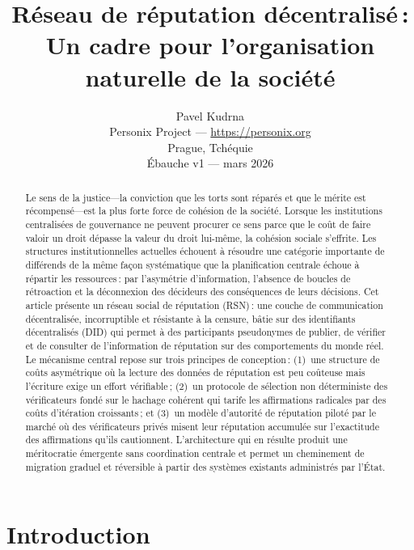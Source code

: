 \documentclass[11pt,a4paper,twocolumn]{article}
\title{\textbf{Réseau de réputation décentralisé\,:\\Un cadre pour l'organisation naturelle de la société}}
\author{Pavel Kudrna\\Personix Project --- \url{https://personix.org}\\Prague, Tchéquie\\Ébauche v1 --- mars 2026}
\date{}
\begin{document}
\maketitle

\begin{abstract}
Le sens de la justice---la conviction que les torts sont réparés et que le mérite est récompensé---est la plus forte force de cohésion de la société. Lorsque les institutions centralisées de gouvernance ne peuvent procurer ce sens parce que le coût de faire valoir un droit dépasse la valeur du droit lui-même, la cohésion sociale s'effrite. Les structures institutionnelles actuelles échouent à résoudre une catégorie importante de différends de la même façon systématique que la planification centrale échoue à répartir les ressources\,: par l'asymétrie d'information, l'absence de boucles de rétroaction et la déconnexion des décideurs des conséquences de leurs décisions. Cet article présente un réseau social de réputation (RSN)\,: une couche de communication décentralisée, incorruptible et résistante à la censure, bâtie sur des identifiants décentralisés (DID) qui permet à des participants pseudonymes de publier, de vérifier et de consulter de l'information de réputation sur des comportements du monde réel. Le mécanisme central repose sur trois principes de conception\,: (1)~une structure de coûts asymétrique où la lecture des données de réputation est peu coûteuse mais l'écriture exige un effort vérifiable\,; (2)~un protocole de sélection non déterministe des vérificateurs fondé sur le hachage cohérent qui tarife les affirmations radicales par des coûts d'itération croissants\,; et (3)~un modèle d'autorité de réputation piloté par le marché où des vérificateurs privés misent leur réputation accumulée sur l'exactitude des affirmations qu'ils cautionnent. L'architecture qui en résulte produit une méritocratie émergente sans coordination centrale et permet un cheminement de migration graduel et réversible à partir des systèmes existants administrés par l'État.
\end{abstract}

\section{Introduction}
\end{document}
